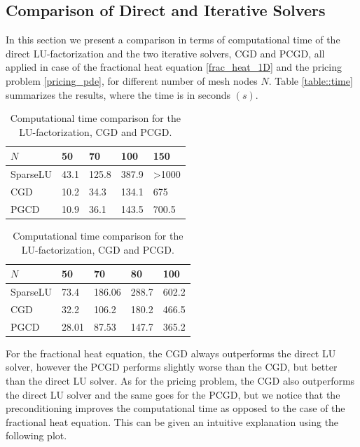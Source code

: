 \subsection{Comparison of Direct and Iterative Solvers}
In this section we present a comparison in terms of computational time of the direct LU-factorization and the two iterative solvers, CGD and PCGD, all applied in case of the fractional heat equation \eqref{frac_heat_1D} and the pricing problem \eqref{pricing_pde}, for different number of mesh nodes $N$.  Table \eqref{table::time} summarizes the results, where the time is in seconds $(s)$. 
\begin{table}[h]
\centering
\begin{subtable}{0.5\textwidth}
  \centering
\begin{tabular}{|l|l|l|l|l|}
\hline
$N$        & 50   & 70    & 100   & 150                \\ \hline
SparseLU & 43.1 & 125.8 & 387.9 & \textgreater{}1000 \\ \hline
CGD      & 10.2 & 34.3 & 134.1 & 675             \\ \hline
PGCD     & 10.9 & 36.1 & 143.5 & 700.5        \\ \hline
\end{tabular}
  \caption{The fractional heat equation. }
  \label{fig:table1}
\end{subtable}%
\begin{subtable}{0.5\textwidth}
  \centering
\begin{tabular}{|l|l|l|l|l|}
\hline
$N$        & 50   & 70    & 80   & 100               \\ \hline
SparseLU & 73.4 & 186.06 & 288.7 & 602.2 \\ \hline
CGD      & 32.2 & 106.2 & 180.2 & 466.5           \\ \hline
PGCD     & 28.01 & 87.53 & 147.7 & 365.2        \\ \hline
\end{tabular}
  \caption{The pricing problem.}
  \label{fig:tabl2}
\end{subtable}%
\caption{Computational time comparison for the LU-factorization, CGD and PCGD.}
\label{table::time}
\end{table}
For the fractional heat equation, the CGD always outperforms the direct LU solver, however the PCGD performs slightly worse than the CGD, but better than the direct LU solver. As for the pricing problem, the CGD also outperforms the direct LU solver and the same goes for the PCGD, but we notice that the preconditioning improves the computational time as opposed to the case of the fractional heat equation. This can be given an intuitive explanation using the following plot.

